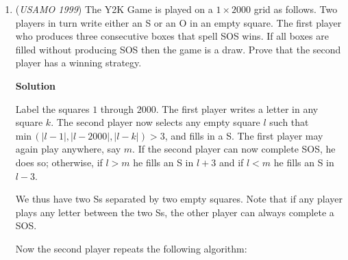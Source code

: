 \begin{enumerate}
 



\textbf{Solution 3}

Assume the contrary for maximum $M$ that $M < 2$. Then, all $a_i \leq M < 2$ hence $a_i < 2$. Note that $(a_i)(a_i - 2) < 0$ and therefore $a_i^2 < 2a_i$. When summing over all $n$, that implies $n^2 < 2\sum a_i$. Note that $\sum a_i < 2n$ and therefore $n^2 < 4n$ and thus $n < 4$. However $n \in \mathbb{Z}^+ \neq 1,2,3$ hence a contradiction arises, and so the maximum $M \ge 2$ as requested. $\square$
<i>Alternate solutions are always welcome. If you have a different, elegant solution to this problem, please \href{https://artofproblemsolving.com/wiki/index.php?title=1999\_USAMO\_Problems/Problem\_4&action=edit}{add it} to this page.</i>



	\item (\textit{USAMO 1999}) The Y2K Game is played on a $1 \times 2000$ grid as follows. Two players in turn write either an S or an O in an empty square. The first player who produces three consecutive boxes that spell SOS wins. If all boxes are filled without producing SOS then the game is a draw. Prove that the second player has a winning strategy.


 



\textbf{Solution}

Label the squares $1$ through $2000$. The first player writes a letter in any square $k$. The second player now selects any empty square $l$ such that $\text{min}\,(|l-1|,|l-2000|,|l-k|) > 3$, and fills in a S. The first player may again play anywhere, say $m$. If the second player can now complete SOS, he does so; otherwise, if $l > m$ he fills an S in $l + 3$ and if $l < m$ he fills an S in $l-3$. 

 We thus have two Ss separated by two empty squares. Note that if any player plays any letter between the two Ss, the other player can always complete a SOS. 

 Now the second player repeats the following algorithm:


\end{enumerate}
